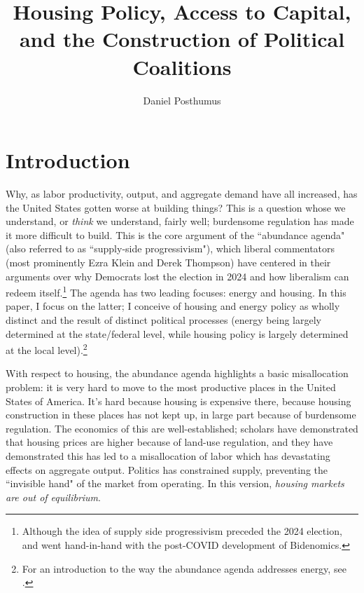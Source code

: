 \documentclass{article}[11pt]
\begin{document}
\title{Housing Policy, Access to Capital, and the Construction of Political Coalitions} 
\author{Daniel Posthumus}

\maketitle

\section{Introduction}
Why, as labor productivity, output, and aggregate demand have all increased, has the United States gotten worse at building things? This is a question whose we understand, or \textit{think} we understand, fairly well; burdensome regulation has made it more difficult to build. This is the core argument of the ``abundance agenda" (also referred to as ``supply-side progressivism"), which liberal commentators (most prominently Ezra Klein and Derek Thompson) have centered in their arguments over why Democrats lost the election in 2024 and how liberalism can redeem itself.\footnote{Although the idea of supply side progressivism preceded the 2024 election, and went hand-in-hand with the post-COVID development of Bidenomics.} \citep{klein2021economic} The agenda has two leading focuses: energy and housing. In this paper, I focus on the latter; I conceive of housing and energy policy as wholly distinct and the result of distinct political processes (energy being largely determined at the state/federal level, while housing policy is largely determined at the local level).\footnote{For an introduction to the way the abundance agenda addresses energy, see \citep{cheap2022energy}.}

With respect to housing, the abundance agenda highlights a basic misallocation problem: it is very hard to move to the most productive places in the United States of America. It's hard because housing is expensive there, because housing construction in these places has not kept up, in large part because of burdensome regulation. \citep{glaeser2005} \citep{glaeser2005empirical} The economics of this are well-established; scholars have demonstrated that housing prices are higher because of land-use regulation, and they have demonstrated this has led to a misallocation of labor which has devastating effects on aggregate output. \citep{hsieh2019housing} Politics has constrained supply, preventing the ``invisible hand" of the market from operating. In this version, \textit{housing markets are out of equilibrium}. 
\end{document}
